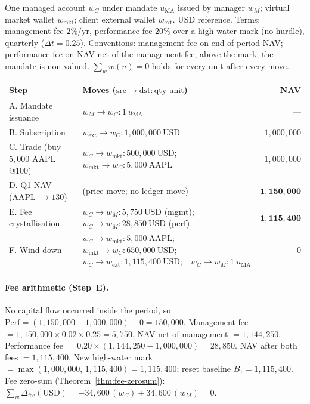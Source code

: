 \documentclass[11pt,a4paper]{article}
\begin{document}
One managed account $w_C$ under mandate $u_{\mathrm{MA}}$ issued by manager $w_M$; virtual market
wallet $w_{\text{mkt}}$; client external wallet $w_{\text{ext}}$. USD reference. Terms: management
fee $2\%/\text{yr}$, performance fee $20\%$ over a high-water mark (no hurdle), quarterly
($\Delta t=0.25$). Conventions: management fee on end-of-period NAV; performance fee on NAV net of
the management fee, above the mark; the mandate is non-valued. $\sum_w w(u)=0$ holds for every unit
after every move.

\begin{longtable}{p{4.3cm}p{7.2cm}r}
\toprule
\textbf{Step} & \textbf{Moves} ($\text{src}\to\text{dst}:\text{qty unit}$) & \textbf{NAV} \\
\midrule
A. Mandate issuance & $w_M\to w_C:1\ u_{\mathrm{MA}}$ & --- \\
B. Subscription & $w_{\text{ext}}\to w_C:1{,}000{,}000\ \text{USD}$ & $1{,}000{,}000$ \\
C. Trade (buy $5{,}000$ AAPL @100) & $w_C\to w_{\text{mkt}}:500{,}000\ \text{USD}$;\ \ $w_{\text{mkt}}\to w_C:5{,}000\ \text{AAPL}$ & $1{,}000{,}000$ \\
D. Q1 NAV (AAPL $\to 130$) & (price move; no ledger move) & $\mathbf{1{,}150{,}000}$ \\
E. Fee crystallisation & $w_C\to w_M:5{,}750\ \text{USD}$ (mgmt);\ \ $w_C\to w_M:28{,}850\ \text{USD}$ (perf) & $\mathbf{1{,}115{,}400}$ \\
F. Wind-down & $w_C\to w_{\text{mkt}}:5{,}000\ \text{AAPL}$;\ \ $w_{\text{mkt}}\to w_C:650{,}000\ \text{USD}$;\ \ $w_C\to w_{\text{ext}}:1{,}115{,}400\ \text{USD}$;\ \ $w_C\to w_M:1\ u_{\mathrm{MA}}$ & $0$ \\
\bottomrule
\end{longtable}

\paragraph{Fee arithmetic (Step~E).} No capital flow occurred inside the period, so
$\mathrm{Perf}=(1{,}150{,}000-1{,}000{,}000)-0=150{,}000$. Management fee
$=1{,}150{,}000\times0.02\times0.25=5{,}750$. NAV net of management $=1{,}144{,}250$. Performance
fee $=0.20\times(1{,}144{,}250-1{,}000{,}000)=28{,}850$. NAV after both fees $=1{,}115{,}400$. New
high-water mark $=\max(1{,}000{,}000,\,1{,}115{,}400)=1{,}115{,}400$; reset baseline
$B_1=1{,}115{,}400$. Fee zero-sum (Theorem~\ref{thm:fee-zerosum}):
$\sum_w\Delta_{\text{fee}}(\text{USD})=-34{,}600\,(w_C)+34{,}600\,(w_M)=0$.
\end{document}
